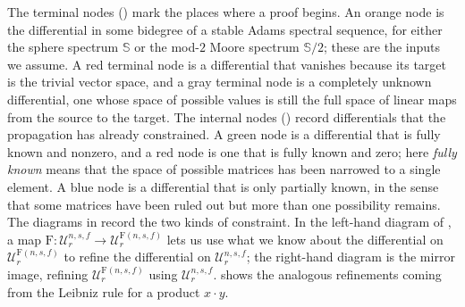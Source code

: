 \documentclass[dvipsnames,table]{amsart}
\theoremstyle{definition}
\theoremstyle{remark}
\numberwithin{equation}{section}
\begin{document}
The terminal nodes () mark the places where a proof begins. An
orange node is the differential in some bidegree of a stable Adams spectral
sequence, for either the sphere spectrum $\mathbb{S}$ or the mod-$2$ Moore
spectrum $\mathbb{S}/2$; these are the inputs we assume. A red terminal node is a
differential that vanishes because its target is the trivial vector space, and a
gray terminal node is a completely unknown differential, one whose space of
possible values is still the full space of linear maps from the source to the
target. The internal nodes () record differentials that the propagation has
already constrained. A green node is a differential that is fully known and
nonzero, and a red node is one that is fully known and zero; here \emph{fully
known} means that the space of possible matrices has been narrowed to a single
element. A blue node is a differential that is only partially known, in the
sense that some matrices have been ruled out but more than one possibility
remains. The diagrams in  record the two kinds of constraint. In the
left-hand diagram of , a map
$\mathrm{F}\colon \mathcal{U}_r^{n,s,f} \to \mathcal{U}_r^{\mathrm{F}(n,s,f)}$ lets us use what we
know about the differential on $\mathcal{U}_r^{\mathrm{F}(n,s,f)}$ to refine the
differential on $\mathcal{U}_r^{n,s,f}$; the right-hand diagram is the mirror
image, refining $\mathcal{U}_r^{\mathrm{F}(n,s,f)}$ using $\mathcal{U}_r^{n,s,f}$. 
shows the analogous refinements coming from the Leibniz rule for a product
$x\cdot y$.
\end{document}
